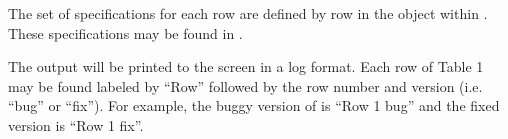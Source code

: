 \documentclass{acmart} %
\begin{document}
The set of \newls specifications for each row are defined by row in the  object within .  These specifications may be found in .

The output will be printed to the screen in a log format.  Each row of Table 1 may be found labeled by ``Row'' followed by the row number and version (i.e. ``bug'' or ``fix'').  For example, the buggy version of \apGa is ``Row 1 bug'' and the fixed version is ``Row 1 fix''.  

\newcommand{\cTimeout}{\showclock{0}{45}}
\newsavebox{\cSafeBox}
\newcommand{\cSafe}{
\usebox{\cSafeBox}
}

\newsavebox{\cSafeToFiveBox}
\newcommand{\cSafeToFive}{
\usebox{\cSafeToFiveBox}
}

\newsavebox{\cAlarmBox}
\newcommand{\cAlarm}{\usebox{\cAlarmBox}}
%
\end{document}
